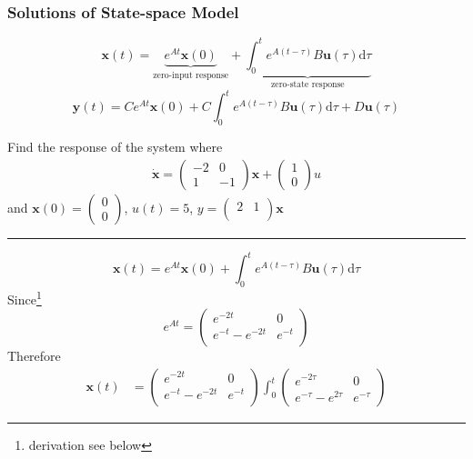\subsubsection{Solutions of State-space Model}
\[\mathbf{x}(t) = \underbrace{e^{At}\mathbf{x}(0)}_{\text{zero-input response}}+\underbrace{\int_{0}^{t}e^{A(t-\tau)}B\mathbf{u}(\tau)\mathrm{d}\tau}_{\text{zero-state response}}\]
\[\mathbf{y}(t) = Ce^{At}\mathbf{x}(0)+C\int_{0}^{t}e^{A(t-\tau)}B\mathbf{u}(\tau)\mathrm{d}\tau+D\mathbf{u}(\tau)\]

\begin{ex}{}
Find the response of the system where 
\begin{gather*}
\mathbf{\dot{x}}=\begin{pmatrix} -
2&0\\
1&-1
\end{pmatrix}
\mathbf{x}+
\begin{pmatrix}
1\\0
\end{pmatrix}u
\end{gather*}
and $\mathbf{x}(0)=\begin{pmatrix} 0\\0 \end{pmatrix}$, $u(t)=5$, $y =\begin{pmatrix}
2&1\\
\end{pmatrix}
 \mathbf{x}$
\vspace{.2cm}\hrule
\[\mathbf{x}(t) = e^{At}\mathbf{x}(0)+\int_{0}^{t}e^{A(t-\tau)}B\mathbf{u}(\tau)\mathrm{d}\tau\]
Since\footnote{derivation see below}
\[e^{At} = \begin{pmatrix}
e^{-2t} & 0\\
e^{-t}-e^{-2t} & e^{-t}\\
\end{pmatrix}
\]
Therefore
\begin{equation*}
\begin{aligned}
\mathbf{x}(t) &= \begin{pmatrix}
e^{-2t} & 0\\
e^{-t}-e^{-2t} & e^{-t}\\
\end{pmatrix}
\int^{t}_{0}
\begin{pmatrix}
e^{-2\tau} & 0\\
e^{-\tau}-e^{2\tau} & e^{-\tau}
\end{pmatrix}

\end{aligned}
\end{equation*}
\end{ex}

